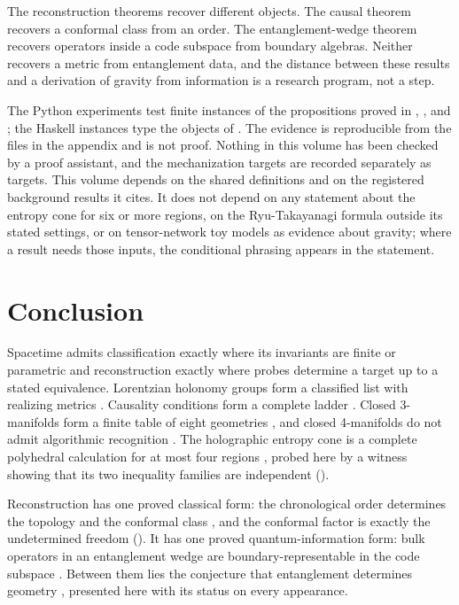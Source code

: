 \documentclass[11pt,letterpaper]{article}
\theoremstyle{definition}
\theoremstyle{remark}
\begin{document}
The reconstruction theorems recover different objects. The causal theorem  recovers a conformal class from an order. The entanglement-wedge theorem  recovers operators inside a code subspace from boundary algebras. Neither recovers a metric from entanglement data, and the distance between these results and a derivation of gravity from information is a research program, not a step.

The Python experiments test finite instances of the propositions proved in , , and ; the Haskell instances type the objects of . The evidence is reproducible from the files in the appendix and is not proof. Nothing in this volume has been checked by a proof assistant, and the mechanization targets are recorded separately as targets. This volume depends on the shared definitions and on the registered background results it cites. It does not depend on any statement about the entropy cone for six or more regions, on the Ryu-Takayanagi formula outside its stated settings, or on tensor-network toy models as evidence about gravity; where a result needs those inputs, the conditional phrasing appears in the statement.

\section{Conclusion}

Spacetime admits classification exactly where its invariants are finite or parametric and reconstruction exactly where probes determine a target up to a stated equivalence. Lorentzian holonomy groups form a classified list with realizing metrics \cite{galaev}. Causality conditions form a complete ladder \cite{minguzzisanchez}. Closed 3-manifolds form a finite table of eight geometries \cite{perelman,thurston1982}, and closed 4-manifolds do not admit algorithmic recognition \cite{tancer}. The holographic entropy cone is a complete polyhedral calculation for at most four regions \cite{baoetal}, probed here by a witness showing that its two inequality families are independent ().

Reconstruction has one proved classical form: the chronological order determines the topology and the conformal class \cite{malament}, and the conformal factor is exactly the undetermined freedom (). It has one proved quantum-information form: bulk operators in an entanglement wedge are boundary-representable in the code subspace \cite{dongharlowwall}. Between them lies the conjecture that entanglement determines geometry \cite{ryutakayanagi,haappy,vanraamsdonk}, presented here with its status on every appearance.
\end{document}
